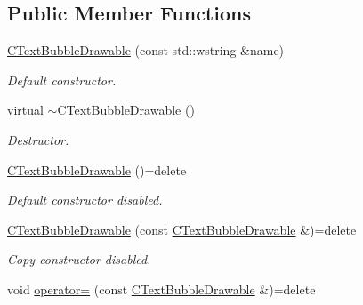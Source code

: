 \subsection*{Public Member Functions}
\begin{DoxyCompactItemize}
\item 
\hyperlink{class_c_text_bubble_drawable_a65188df7a034a6a4df50866b504abedb}{C\+Text\+Bubble\+Drawable} (const std\+::wstring \&name)
\begin{DoxyCompactList}\small\item\em Default constructor. \end{DoxyCompactList}\item 
\hypertarget{class_c_text_bubble_drawable_aa573f267e94aaf7f15940b30cae40141}{virtual \hyperlink{class_c_text_bubble_drawable_aa573f267e94aaf7f15940b30cae40141}{$\sim$\+C\+Text\+Bubble\+Drawable} ()}\label{class_c_text_bubble_drawable_aa573f267e94aaf7f15940b30cae40141}

\begin{DoxyCompactList}\small\item\em Destructor. \end{DoxyCompactList}\item 
\hypertarget{class_c_text_bubble_drawable_a4e7c9168364e4eb0c8765c2bbde378ef}{\hyperlink{class_c_text_bubble_drawable_a4e7c9168364e4eb0c8765c2bbde378ef}{C\+Text\+Bubble\+Drawable} ()=delete}\label{class_c_text_bubble_drawable_a4e7c9168364e4eb0c8765c2bbde378ef}

\begin{DoxyCompactList}\small\item\em Default constructor disabled. \end{DoxyCompactList}\item 
\hypertarget{class_c_text_bubble_drawable_a93a6ab5582897e65fafa41c8f9b8643c}{\hyperlink{class_c_text_bubble_drawable_a93a6ab5582897e65fafa41c8f9b8643c}{C\+Text\+Bubble\+Drawable} (const \hyperlink{class_c_text_bubble_drawable}{C\+Text\+Bubble\+Drawable} \&)=delete}\label{class_c_text_bubble_drawable_a93a6ab5582897e65fafa41c8f9b8643c}

\begin{DoxyCompactList}\small\item\em Copy constructor disabled. \end{DoxyCompactList}\item 
\hypertarget{class_c_text_bubble_drawable_aa1895ac0e75e9783e17634fc2d04447f}{void \hyperlink{class_c_text_bubble_drawable_aa1895ac0e75e9783e17634fc2d04447f}{operator=} (const \hyperlink{class_c_text_bubble_drawable}{C\+Text\+Bubble\+Drawable} \&)=delete}\label{class_c_text_bubble_drawable_aa1895ac0e75e9783e17634fc2d04447f}


\end{DoxyCompactItemize}
